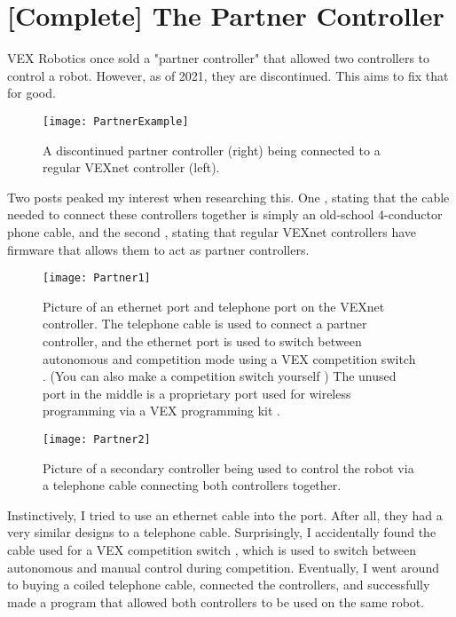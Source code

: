 \section{[Complete] The Partner Controller}

VEX Robotics once sold a "partner controller" that allowed two controllers to control a robot. However, as of 2021, they are discontinued. This aims to fix that for good.

\begin{figure}[h]
    \centering
    \texttt{[image: PartnerExample]}
    \caption{
        A discontinued partner controller (right) being connected to a regular VEXnet controller (left).
    }
\end{figure}

Two posts peaked my interest when researching this. One \cite{PartnerCite2}, stating that the cable needed to connect these controllers together is simply an old-school 4-conductor phone cable, and the second \cite{PartnerCite1}, stating that regular VEXnet controllers have firmware that allows them to act as partner controllers.

\begin{figure}[h]
    \centering
    \texttt{[image: Partner1]}
    \caption{
        Picture of an ethernet port and telephone port on the VEXnet controller. The telephone cable is used to connect a partner controller, and the ethernet port is used to switch between autonomous and competition mode using a VEX competition switch \cite{VEXCompSwitch}. (You can also make a competition switch yourself \cite{VEXDIYCompSwitch}) The unused port in the middle is a proprietary port used for wireless programming via a VEX programming kit \cite{VEXProgrammingKit}.
    }
\end{figure}


\begin{figure}[h]
    \centering
    \texttt{[image: Partner2]}
    \caption{
        Picture of a secondary controller being used to control the robot via a telephone cable connecting both controllers together.
    }
\end{figure}

Instinctively, I tried to use an ethernet cable into the port. After all, they had a very similar designs to a telephone cable. Surprisingly, I accidentally found the cable used for a VEX competition switch \cite{VEXCompSwitch}, which is used to switch between autonomous and manual control during competition. Eventually, I went around to buying a coiled telephone cable, connected the controllers, and successfully made a program that allowed both controllers to be used on the same robot.
